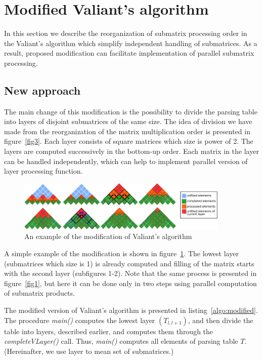 \section{\bf Modified Valiant's algorithm}

In this section we describe the reorganization of submatrix processing order in the Valiant's algorithm which simplify independent handling of submatrices. As a result, proposed modification can facilitate implementation of parallel submatrix processing.

\subsection{New approach}

The main change of this modification is the possibility to divide the parsing table into layers of disjoint submatrices of the same size.
The idea of division we have made from the reorganization of the matrix multiplication order is presented in figure~\ref{fig3}.
Each layer consists of square matrices which size is power of 2.
The layers are computed successively in the bottom-up order.
Each matrix in the layer can be handled independently, which can help to implement parallel version of layer processing function.

\begin{figure}
    \centering
    \includegraphics[width=0.9\textwidth]{pictures/modivis2.pdf}
    \caption{An example of the modification of Valiant's algorithm}
    \label{fig4}
\end{figure}

A simple example of the modification is shown in figure~\ref{fig4}. 
The lowest layer (submatrices which size is 1) is already computed and filling of the matrix starts with the second layer (subfigures 1-2). 
Note that the same  process is presented in figure~\ref{fig1}, but here it can be done only in two steps using parallel computation of submatrix products.

The modified version of Valiant's algorithm is presented in listing~\ref{algo:modified}.
The procedure \textit{main()} computes the lowest layer $(T_{l, l+1})$, and then divide the table into layers, described earlier, and computes them through the \textit{completeVLayer()} call.
Thus, \textit{main()} computes all elements of parsing table $T$.
(Hereinafter, we use layer to mean set of submatrices.)

